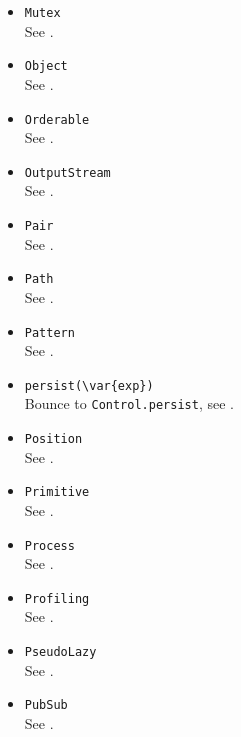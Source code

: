 \begin{itemize}
\item \lstinline|Mutex|\\
  See .

\item \lstinline|Object|\\
  See .

\item \lstinline|Orderable|\\
  See .

\item \lstinline|OutputStream|\\
  See .

\item \lstinline|Pair|\\
  See .

\item \lstinline|Path|\\
  See .

\item \lstinline|Pattern|\\
  See .

\item \lstinline|persist(\var{exp})|\\
  Bounce to \lstinline|Control.persist|, see .

\item \lstinline|Position|\\
  See .

\item \lstinline|Primitive|\\
  See .

\item \lstinline|Process|\\
  See .

\item \lstinline|Profiling|\\
  See .

\item \lstinline|PseudoLazy|\\
  See .

\item \lstinline|PubSub|\\
  See .


\end{itemize}
